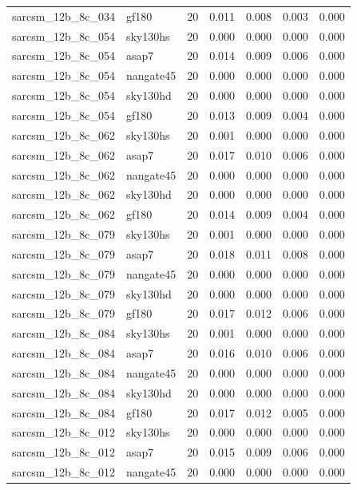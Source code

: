 \begin{tabular}{llrrrrr}
sarcsm\_12b\_8c\_034 & gf180 & 20 & 0.011 & 0.008 & 0.003 & 0.000 \\
sarcsm\_12b\_8c\_054 & sky130hs & 20 & 0.000 & 0.000 & 0.000 & 0.000 \\
sarcsm\_12b\_8c\_054 & asap7 & 20 & 0.014 & 0.009 & 0.006 & 0.000 \\
sarcsm\_12b\_8c\_054 & nangate45 & 20 & 0.000 & 0.000 & 0.000 & 0.000 \\
sarcsm\_12b\_8c\_054 & sky130hd & 20 & 0.000 & 0.000 & 0.000 & 0.000 \\
sarcsm\_12b\_8c\_054 & gf180 & 20 & 0.013 & 0.009 & 0.004 & 0.000 \\
sarcsm\_12b\_8c\_062 & sky130hs & 20 & 0.001 & 0.000 & 0.000 & 0.000 \\
sarcsm\_12b\_8c\_062 & asap7 & 20 & 0.017 & 0.010 & 0.006 & 0.000 \\
sarcsm\_12b\_8c\_062 & nangate45 & 20 & 0.000 & 0.000 & 0.000 & 0.000 \\
sarcsm\_12b\_8c\_062 & sky130hd & 20 & 0.000 & 0.000 & 0.000 & 0.000 \\
sarcsm\_12b\_8c\_062 & gf180 & 20 & 0.014 & 0.009 & 0.004 & 0.000 \\
sarcsm\_12b\_8c\_079 & sky130hs & 20 & 0.001 & 0.000 & 0.000 & 0.000 \\
sarcsm\_12b\_8c\_079 & asap7 & 20 & 0.018 & 0.011 & 0.008 & 0.000 \\
sarcsm\_12b\_8c\_079 & nangate45 & 20 & 0.000 & 0.000 & 0.000 & 0.000 \\
sarcsm\_12b\_8c\_079 & sky130hd & 20 & 0.000 & 0.000 & 0.000 & 0.000 \\
sarcsm\_12b\_8c\_079 & gf180 & 20 & 0.017 & 0.012 & 0.006 & 0.000 \\
sarcsm\_12b\_8c\_084 & sky130hs & 20 & 0.001 & 0.000 & 0.000 & 0.000 \\
sarcsm\_12b\_8c\_084 & asap7 & 20 & 0.016 & 0.010 & 0.006 & 0.000 \\
sarcsm\_12b\_8c\_084 & nangate45 & 20 & 0.000 & 0.000 & 0.000 & 0.000 \\
sarcsm\_12b\_8c\_084 & sky130hd & 20 & 0.000 & 0.000 & 0.000 & 0.000 \\
sarcsm\_12b\_8c\_084 & gf180 & 20 & 0.017 & 0.012 & 0.005 & 0.000 \\
sarcsm\_12b\_8c\_012 & sky130hs & 20 & 0.000 & 0.000 & 0.000 & 0.000 \\
sarcsm\_12b\_8c\_012 & asap7 & 20 & 0.015 & 0.009 & 0.006 & 0.000 \\
sarcsm\_12b\_8c\_012 & nangate45 & 20 & 0.000 & 0.000 & 0.000 & 0.000 \\

\end{tabular}
